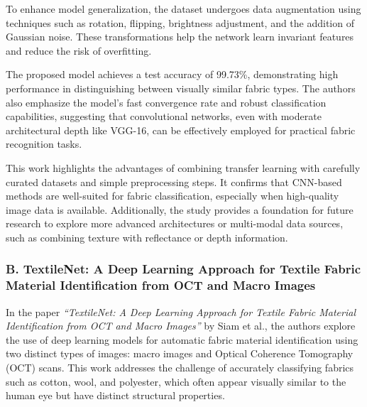 To enhance model generalization, the dataset undergoes data augmentation using techniques such as rotation, flipping, brightness adjustment, and the addition of Gaussian noise. These transformations help the network learn invariant features and reduce the risk of overfitting.

The proposed model achieves a test accuracy of 99.73\%, demonstrating high performance in distinguishing between visually similar fabric types. The authors also emphasize the model’s fast convergence rate and robust classification capabilities, suggesting that convolutional networks, even with moderate architectural depth like VGG-16, can be effectively employed for practical fabric recognition tasks.

This work highlights the advantages of combining transfer learning with carefully curated datasets and simple preprocessing steps. It confirms that CNN-based methods are well-suited for fabric classification, especially when high-quality image data is available. Additionally, the study provides a foundation for future research to explore more advanced architectures or multi-modal data sources, such as combining texture with reflectance or depth information.

\subsubsection[B. TextileNet: A Deep Learning Approach for Textile Fabric Material Identification from OCT and Macro Images]{B. TextileNet: A Deep Learning Approach for Textile Fabric Material Identification from OCT and Macro Images~\cite{siam2023textilenet}}

In the paper \textit{“TextileNet: A Deep Learning Approach for Textile Fabric Material Identification from OCT and Macro Images”} by Siam et al., the authors explore the use of deep learning models for automatic fabric material identification using two distinct types of images: macro images and Optical Coherence Tomography (OCT) scans. This work addresses the challenge of accurately classifying fabrics such as cotton, wool, and polyester, which often appear visually similar to the human eye but have distinct structural properties.

